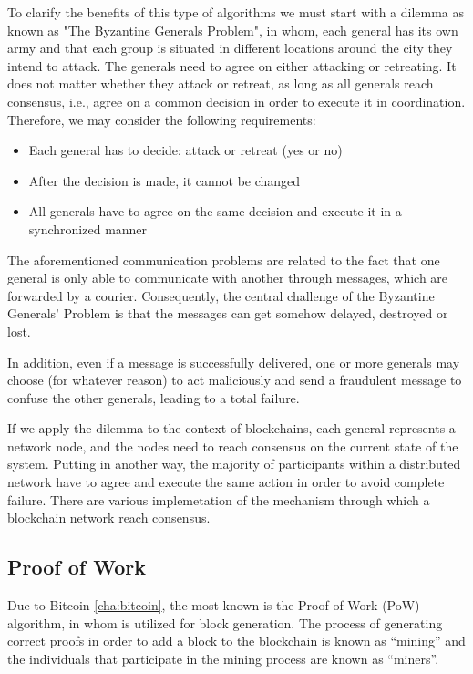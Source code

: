 To clarify the benefits of this type of algorithms we must start with a 
dilemma as known as "The Byzantine Generals Problem", in whom, each 
general has its own army and that each group is situated in different 
locations around the city they intend to attack. The generals need to 
agree on either attacking or retreating. It does not matter whether 
they attack or retreat, as long as all generals reach consensus, 
i.e., agree on a common decision in order to execute it in coordination. 
Therefore, we may consider the following requirements:
\begin{itemize}
    \item Each general has to decide: attack or retreat (yes or no)
    \item After the decision is made, it cannot be changed
    \item All generals have to agree on the same decision and execute it in a synchronized manner
\end{itemize}
The aforementioned communication problems are related to the fact that 
one general is only able to communicate with another through messages, 
which are forwarded by a courier. Consequently, the central challenge 
of the Byzantine Generals’ Problem is that the messages can get somehow 
delayed, destroyed or lost.

In addition, even if a message is successfully delivered, one or more 
generals may choose (for whatever reason) to act maliciously and send 
a fraudulent message to confuse the other generals, leading to a total 
failure.

If we apply the dilemma to the context of blockchains, each general 
represents a network node, and the nodes need to reach consensus on 
the current state of the system. Putting in another way, the majority 
of participants within a distributed network have to agree and execute 
the same action in order to avoid complete failure.\cite{byzantine}\cite{binancevision}
There are various implemetation of the mechanism through which a blockchain 
network reach consensus.


\subsection{Proof of Work}
\label{sec:pow}

Due to Bitcoin \ref{cha:bitcoin}, the most known is the Proof of 
Work (PoW) algorithm, in whom is utilized for block generation. 
The process of generating correct proofs in order to add a block 
to the blockchain is known as “mining” and the individuals that 
participate in the mining process are known as “miners”.\cite{consensusmedium}

